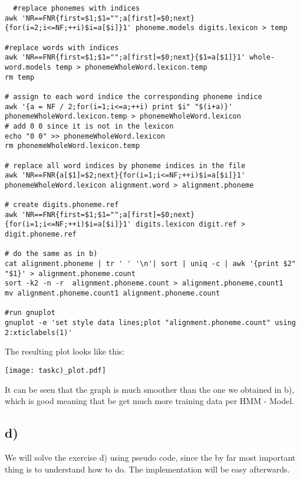 \begin{lstlisting}
  #replace phonemes with indices 
awk 'NR==FNR{first=$1;$1="";a[first]=$0;next}{for(i=2;i<=NF;++i)$i=a[$i]}1' phoneme.models digits.lexicon > temp

#replace words with indices 
awk 'NR==FNR{first=$1;$1="";a[first]=$0;next}{$1=a[$1]}1' whole-word.models temp > phonemeWholeWord.lexicon.temp
rm temp

# assign to each word indice the corresponding phoneme indice
awk '{a = NF / 2;for(i=1;i<=a;++i) print $i" "$(i+a)}' phonemeWholeWord.lexicon.temp > phonemeWholeWord.lexicon
# add 0 0 since it is not in the lexicon
echo "0 0" >> phonemeWholeWord.lexicon
rm phonemeWholeWord.lexicon.temp

# replace all word indices by phoneme indices in the file
awk 'NR==FNR{a[$1]=$2;next}{for(i=1;i<=NF;++i)$i=a[$i]}1' phonemeWholeWord.lexicon alignment.word > alignment.phoneme 

# create digits.phoneme.ref
awk 'NR==FNR{first=$1;$1="";a[first]=$0;next}{for(i=1;i<=NF;++i)$i=a[$i]}1' digits.lexicon digit.ref > digit.phoneme.ref

# do the same as in b)
cat alignment.phoneme | tr ' ' '\n'| sort | uniq -c | awk '{print $2" "$1}' > alignment.phoneme.count
sort -k2 -n -r  alignment.phoneme.count > alignment.phoneme.count1
mv alignment.phoneme.count1 alignment.phoneme.count

#run gnuplot
gnuplot -e 'set style data lines;plot "alignment.phoneme.count" using 2:xticlabels(1)'
\end{lstlisting}

The resulting plot looks like this: 

\texttt{[image: taskc)\_plot.pdf]}

It can be seen that the graph is much smoother than the one we obtained in b), which is good meaning that be get much more training data per HMM - Model.


\subsection*{d)} %
\label{sub:d_}

We will solve the exercise d) using pseudo code, since the by far most important thing is to understand how to do.
The implementation will be easy afterwards.

